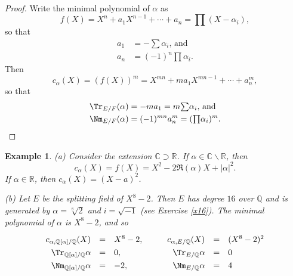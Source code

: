 \documentclass[a4paper,11pt,final,openany]{memoir}
\newtheorem{example}[X]{Example}
\theoremstyle{nonumberplain}
\newtheorem{proof}{Proof.}
\begin{document}
\begin{proof}
Write the minimal polynomial of $\alpha$ as
\[
f(X)=X^{n}+a_{1}X^{n-1}+\cdots+a_{n}=%
{\textstyle\prod}
(X-\alpha_{i}),
\]
so that%
\begin{align*}
a_{1}  &  =-%
{\textstyle\sum}
\alpha_{i}\text{, and}\\
a_{n}  &  =(-1)^{n}%
{\textstyle\prod}
\alpha_{i}\text{.}%
\end{align*}
Then
\[
c_{\alpha}(X)=(f(X))^{m}=X^{mn}+ma_{1}X^{mn-1}+\cdots+a_{n}^{m},
\]
so that
\begin{align*}
\Tr_{E/F}(\alpha)  &  =-ma_{1}=m%
{\textstyle\sum}
\alpha_{i}\text{, and }\\
\Nm_{E/F}(\alpha)  &  =(-1)^{mn}a_{n}^{m}=(%
{\textstyle\prod}
\alpha_{i})^{m}\text{.}%
\end{align*}

\end{proof}

\begin{example}
\label{ag35}(a) Consider the extension $\mathbb{C}\supset\mathbb{R}$. If
$\alpha\in\mathbb{C}\smallsetminus\mathbb{R}$, then
\[
c_{\alpha}(X)=f(X)=X^{2}-2\Re(\alpha)X+|\alpha|^{2}.
\]
If $\alpha\in\mathbb{R}$, then $c_{\alpha}(X)=(X-a)^{2}$.

(b) Let $E$ be the splitting field of $X^{8}-2$. Then $E$ has degree $16$ over
$\mathbb{Q}{}$ and is generated by $\alpha=\sqrt[8]{2}$ and $i=\sqrt{-1}$ (see
Exercise \ref{x16}). The minimal polynomial of $\alpha$ is $X^{8}-2$, and so
\[
\renewcommand{\arraystretch}{1.3}
\begin{array}
[c]{rcllrcl}%
c_{\alpha,\mathbb{Q}{}[\alpha]/\mathbb{Q}{}}(X) & = & X^{8}-2, & \quad &
c_{\alpha,E/\mathbb{Q}{}}(X) & = & (X^{8}-2)^{2}\\
\Tr_{\mathbb{Q}[\alpha]/\mathbb{Q}}\alpha & = & 0,\quad &  & \Tr_{E/\mathbb{Q}%
}\alpha & = & 0\\
\Nm_{\mathbb{Q}[\alpha]/\mathbb{Q}}\alpha & = & -2,\quad &  &
\Nm_{E/\mathbb{Q}}\alpha & = & 4
\end{array}
\]

\end{example}
\end{document}
